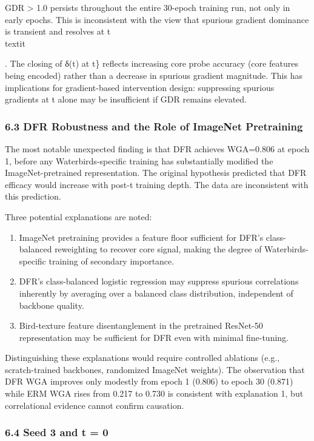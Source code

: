 GDR > 1.0 persists throughout the entire 30-epoch training run, not only in early epochs. This is inconsistent with the view that spurious gradient dominance is transient and resolves at t\\textit{. The closing of δ(t) at t\} reflects increasing core probe accuracy (core features being encoded) rather than a decrease in spurious gradient magnitude. This has implications for gradient-based intervention design: suppressing spurious gradients at t\* alone may be insufficient if GDR remains elevated.

\subsubsection{6.3 DFR Robustness and the Role of ImageNet Pretraining}

The most notable unexpected finding is that DFR achieves WGA=0.806 at epoch 1, before any Waterbirds-specific training has substantially modified the ImageNet-pretrained representation. The original hypothesis predicted that DFR efficacy would increase with post-t\* training depth. The data are inconsistent with this prediction.

Three potential explanations are noted:

\begin{enumerate}
\item ImageNet pretraining provides a feature floor sufficient for DFR's class-balanced reweighting to recover core signal, making the degree of Waterbirds-specific training of secondary importance.
\item DFR's class-balanced logistic regression may suppress spurious correlations inherently by averaging over a balanced class distribution, independent of backbone quality.
\item Bird-texture feature disentanglement in the pretrained ResNet-50 representation may be sufficient for DFR even with minimal fine-tuning.
\end{enumerate}

Distinguishing these explanations would require controlled ablations (e.g., scratch-trained backbones, randomized ImageNet weights). The observation that DFR WGA improves only modestly from epoch 1 (0.806) to epoch 30 (0.871) while ERM WGA rises from 0.217 to 0.730 is consistent with explanation 1, but correlational evidence cannot confirm causation.

\subsubsection{6.4 Seed 3 and t\* = 0}

}
